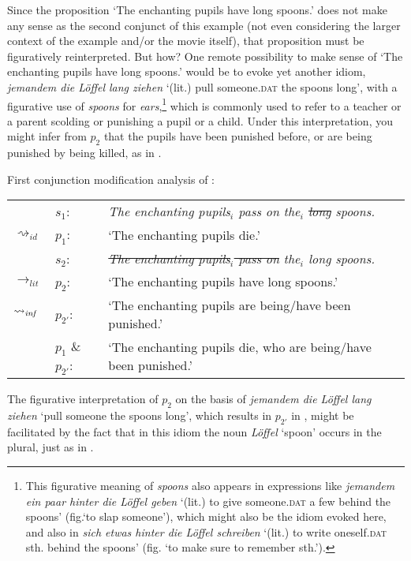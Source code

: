 \documentclass[output=paper]{langsci/langscibook}
\begin{document}
\noindent Since the proposition `The enchanting pupils have long spoons.' does not make any sense as the second conjunct of this example (not even considering the larger context of the example and/or the movie itself), that proposition must be figuratively reinterpreted. But how? One remote possibility to make sense of `The enchanting pupils have long spoons.' would be to evoke yet another idiom, \textit{jemandem die Löffel lang ziehen} `(lit.) pull someone.\textsc{dat} the spoons long', with a figurative use of \textit{spoons} for \textit{ears},\footnote{This figurative meaning of \textit{spoons} also appears in expressions like \textit{jemandem ein paar hinter die Löffel geben} `(lit.) to give someone.\textsc{dat} a few behind the spoons' (fig.\@ `to slap someone'), which might also be the idiom evoked here, and also in \textit{sich etwas hinter die Löffel schreiben} `(lit.) to write oneself.\textsc{dat} sth. behind the spoons' (fig. `to make sure to remember sth.').}
which is commonly used to refer to a teacher or a parent scolding or punishing a pupil or a child. Under this interpretation, you might infer from $p_{2}$ that the pupils have been punished before, or are being punished by being killed, as in .\largerpage[2]

\ea \label{analysis long spoons 1} 
First conjunction modification analysis of :\smallskip\\
\begin{tabularx}{\linewidth}[t]{@{}llQ@{}}
                        & 	$s_{1}$: & \textit{The enchanting pupils$_{i}$ pass on the$_{i}$ \sout{long} spoons.} \\
$\rightsquigarrow_{id}$	&	$p_{1}$: & `The enchanting pupils die.' \medskip\\
                        & 	$s_{2}$: & \textit{\sout{The enchanting pupils$_{i}$ pass on} the$_{i}$ long spoons.} \\
$\rightarrow_{lit}$		&	$p_{2}$: & `The enchanting pupils have long spoons.' \\
$\rightsquigarrow_{\text{\itshape inf}}$	&	$p_{2'}$: & `The enchanting pupils are being\slash have been punished.' \medskip\\
                        &	$p_{1}$ \& $p_{2'}$: & `The enchanting pupils die, who are being\slash have been punished.'\\
\end{tabularx}
\z

\noindent The figurative interpretation of $p_{2}$ on the basis of \textit{jemandem die Löffel lang ziehen} `pull someone the spoons long', which results in $p_{2'}$ in , might be facilitated by the fact that in this idiom the noun \textit{Löffel} `spoon' occurs in the plural, just as in . 
\end{document}
